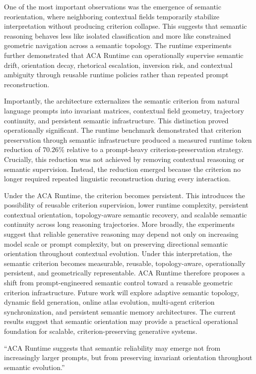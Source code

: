 \documentclass[11pt]{article}
\begin{document}
One of the most important observations was the emergence of semantic reorientation, where neighboring contextual fields temporarily stabilize interpretation without producing criterion collapse. This suggests that semantic reasoning behaves less like isolated classification and more like constrained geometric navigation across a semantic topology. The runtime experiments further demonstrated that ACA Runtime can operationally supervise semantic drift, orientation decay, rhetorical escalation, inversion risk, and contextual ambiguity through reusable runtime policies rather than repeated prompt reconstruction.

Importantly, the architecture externalizes the semantic criterion from natural language prompts into invariant matrices, contextual field geometry, trajectory continuity, and persistent semantic infrastructure. This distinction proved operationally significant. The runtime benchmark demonstrated that criterion preservation through semantic infrastructure produced a measured runtime token reduction of $70.26\%$ relative to a prompt-heavy criterion-preservation strategy. Crucially, this reduction was not achieved by removing contextual reasoning or semantic supervision. Instead, the reduction emerged because the criterion no longer required repeated linguistic reconstruction during every interaction.

Under the ACA Runtime, the criterion becomes persistent. This introduces the possibility of reusable criterion supervision, lower runtime complexity, persistent contextual orientation, topology-aware semantic recovery, and scalable semantic continuity across long reasoning trajectories. More broadly, the experiments suggest that reliable generative reasoning may depend not only on increasing model scale or prompt complexity, but on preserving directional semantic orientation throughout contextual evolution. Under this interpretation, the semantic criterion becomes measurable, reusable, topology-aware, operationally persistent, and geometrically representable. ACA Runtime therefore proposes a shift from prompt-engineered semantic control toward a reusable geometric criterion infrastructure. Future work will explore adaptive semantic topology, dynamic field generation, online atlas evolution, multi-agent criterion synchronization, and persistent semantic memory architectures. The current results suggest that semantic orientation may provide a practical operational foundation for scalable, criterion-preserving generative systems.

“ACA Runtime suggests that semantic reliability may emerge not from increasingly larger prompts, but from preserving invariant orientation throughout semantic evolution.”
\end{document}
